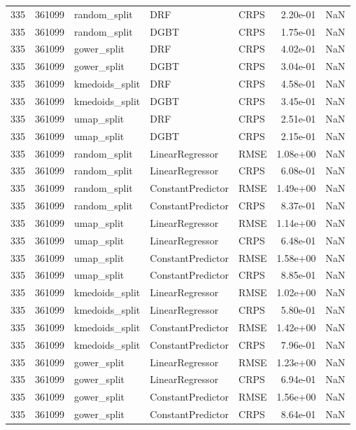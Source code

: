 \begin{tabular}{rrlllrr}
335 & 361099 & random\_split & DRF & CRPS & 2.20e-01 & NaN \\
335 & 361099 & random\_split & DGBT & CRPS & 1.75e-01 & NaN \\
335 & 361099 & gower\_split & DRF & CRPS & 4.02e-01 & NaN \\
335 & 361099 & gower\_split & DGBT & CRPS & 3.04e-01 & NaN \\
335 & 361099 & kmedoids\_split & DRF & CRPS & 4.58e-01 & NaN \\
335 & 361099 & kmedoids\_split & DGBT & CRPS & 3.45e-01 & NaN \\
335 & 361099 & umap\_split & DRF & CRPS & 2.51e-01 & NaN \\
335 & 361099 & umap\_split & DGBT & CRPS & 2.15e-01 & NaN \\
335 & 361099 & random\_split & LinearRegressor & RMSE & 1.08e+00 & NaN \\
335 & 361099 & random\_split & LinearRegressor & CRPS & 6.08e-01 & NaN \\
335 & 361099 & random\_split & ConstantPredictor & RMSE & 1.49e+00 & NaN \\
335 & 361099 & random\_split & ConstantPredictor & CRPS & 8.37e-01 & NaN \\
335 & 361099 & umap\_split & LinearRegressor & RMSE & 1.14e+00 & NaN \\
335 & 361099 & umap\_split & LinearRegressor & CRPS & 6.48e-01 & NaN \\
335 & 361099 & umap\_split & ConstantPredictor & RMSE & 1.58e+00 & NaN \\
335 & 361099 & umap\_split & ConstantPredictor & CRPS & 8.85e-01 & NaN \\
335 & 361099 & kmedoids\_split & LinearRegressor & RMSE & 1.02e+00 & NaN \\
335 & 361099 & kmedoids\_split & LinearRegressor & CRPS & 5.80e-01 & NaN \\
335 & 361099 & kmedoids\_split & ConstantPredictor & RMSE & 1.42e+00 & NaN \\
335 & 361099 & kmedoids\_split & ConstantPredictor & CRPS & 7.96e-01 & NaN \\
335 & 361099 & gower\_split & LinearRegressor & RMSE & 1.23e+00 & NaN \\
335 & 361099 & gower\_split & LinearRegressor & CRPS & 6.94e-01 & NaN \\
335 & 361099 & gower\_split & ConstantPredictor & RMSE & 1.56e+00 & NaN \\
335 & 361099 & gower\_split & ConstantPredictor & CRPS & 8.64e-01 & NaN \\

\end{tabular}
